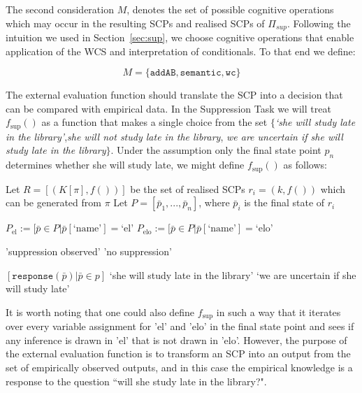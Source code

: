 The second consideration $M$, denotes the set of possible cognitive operations which may occur in the resulting SCPs and realised SCPs of $\Pi_{sup}$. Following the intuition we used in Section~\ref{sec:sup}, we choose cognitive operations that enable application of the WCS and interpretation of conditionals. To that end we define:

\[
M=\{\texttt{addAB}, \texttt{semantic}, \texttt{wc}\}
\]

The external evaluation function should translate the SCP into a decision that can be compared with empirical data. In the Suppression Task we will treat $f_\text{sup}()$ as a function that makes a single choice from the set $\{$\textit{`she will study late in the library'},\textit{she will not study late in the library}, \textit{we are uncertain if she will study late in the library}$\}$. Under the assumption only the final state point $p_n$ determines whether she will study late, we might define $f_\text{sup}()$ as follows:

\begin{algorithm}[H] 
\SetAlgoLined
{}
{
Let $R=[(K[\pi],f())]$ be the set of realised SCPs $r_i=(k,f())$ which can be generated from $\pi$\;
Let $P=[\bar{p}_1,...,\bar{p}_n]$, where $\bar{p}_i$ is the final state of $r_i$\;

$P_\text{el}:=[\bar{p} \in P | \bar{p}[\text{`name'}]=\text{`el'}$\;
$P_\text{elo}:=[\bar{p} \in P | \bar{p}[\text{`name'}]=\text{`elo'}$\;

{
\Return 'suppression observed'
}
\Else
{
\Return 'no suppression'
}
}
{
\Return $[\texttt{response}(\bar{p}) | \bar{p} \in p]$
}
{
{
\Return `she will study late in the library'
}
{
}
\Else
{
\Return `we are uncertain if she will study late'
}
}

\caption{$\texttt{f}_\text{sup}$}
\label{evaluation:f_sup}
\end{algorithm}

It is worth noting that one could also define $f_\text{sup}$ in such a way that it iterates over every variable assignment for 'el' and 'elo' in the final state point and sees if any inference is drawn in 'el' that is not drawn in 'elo'. However, the purpose of the external evaluation function is to transform an SCP into an output from the set of empirically observed outputs, and in this case the empirical knowledge is a response to the question ``will she study late in the library?".

